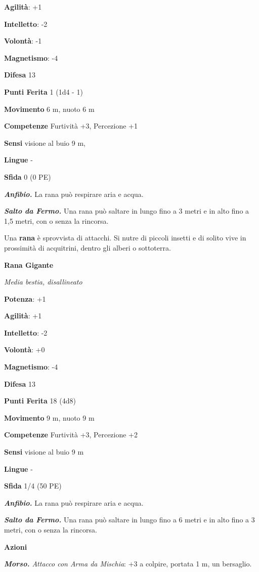 \begin{multicols}{2}
\textbf{Agilità}: +1

\textbf{Intelletto}: -2

\textbf{Volontà}: -1

\textbf{Magnetismo}: -4

\textbf{Difesa} 13

\textbf{Punti Ferita} 1 (1d4 - 1)

\textbf{Movimento} 6 m, nuoto 6 m

\textbf{Competenze} Furtività +3, Percezione +1

\textbf{Sensi} visione al buio 9 m, 

\textbf{Lingue} -

\textbf{Sfida} 0 (0 PE)\smallskip

\emph{\textbf{Anfibio.}} La rana può respirare aria e acqua.

\emph{\textbf{Salto da Fermo.}} Una rana può saltare in lungo fino a 3
metri e in alto fino a 1,5 metri, con o senza la rincorsa.

Una \textbf{rana} è sprovvista di attacchi. Si nutre di piccoli insetti
e di solito vive in prossimità di acquitrini, dentro gli alberi o
sottoterra.

\textbf{Rana Gigante}

\emph{Media bestia, disallineato}

\textbf{Potenza}: +1

\textbf{Agilità}: +1

\textbf{Intelletto}: -2

\textbf{Volontà}: +0

\textbf{Magnetismo}: -4

\textbf{Difesa} 13

\textbf{Punti Ferita} 18 (4d8)

\textbf{Movimento} 9 m, nuoto 9 m

\textbf{Competenze} Furtività +3, Percezione +2

\textbf{Sensi} visione al buio 9 m

\textbf{Lingue} -

\textbf{Sfida} 1/4 (50 PE)\smallskip

\emph{\textbf{Anfibio.}} La rana può respirare aria e acqua.

\emph{\textbf{Salto da Fermo.}} Una rana può saltare in lungo fino a 6
metri e in alto fino a 3 metri, con o senza la rincorsa.

\smallskip\textbf{Azioni}

\emph{\textbf{Morso.} Attacco con Arma da Mischia}: +3 a colpire,
portata 1 m, un bersaglio.


\end{multicols}
